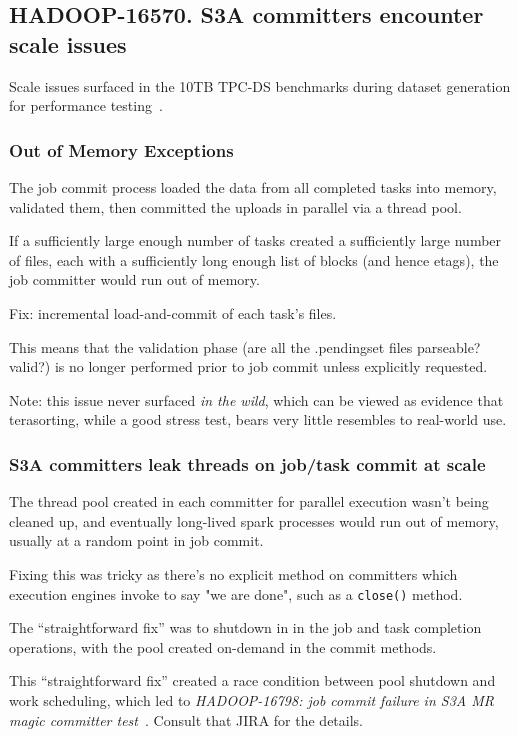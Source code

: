 \documentclass[conference]{IEEEtran}
\begin{document}
\subsection{HADOOP-16570. S3A committers encounter scale issues}
\label{subsec:scale}


Scale issues surfaced in the 10TB TPC-DS benchmarks during dataset generation
for performance testing\ \cite{HADOOP-16570}.

\subsubsection{Out of Memory Exceptions}

The job commit process loaded the data from all completed tasks into memory,
validated them, then committed the uploads in parallel via a thread pool.

If a sufficiently large enough number of tasks created a sufficiently large
number of files, each with a sufficiently long enough list of blocks
(and hence etags), the job committer would run out of memory.

Fix: incremental load-and-commit of each task's files.

This means that the validation phase
(are all the .pendingset files parseable? valid?) is no longer performed
prior to job commit unless explicitly requested.

Note: this issue never surfaced \emph{in the wild}, which can be
viewed as evidence that terasorting, while a good stress test,
bears very little resembles to real-world use.

\subsubsection{S3A committers leak threads on job/task commit at scale}

The thread pool created in each committer for parallel execution wasn't being
cleaned up, and eventually long-lived spark processes would run out of memory,
usually at a random point in job commit.

Fixing this was tricky as there's no explicit method on committers which
execution engines invoke to say "we are done", such as a \texttt{close()} method.

The ``straightforward fix'' was to shutdown in in the job and task completion
operations, with the pool created on-demand in the commit methods.

This ``straightforward fix'' created a race condition between pool shutdown
and work scheduling, which led to \emph{HADOOP-16798: job commit failure in S3A
MR magic committer test}\ \cite{HADOOP-16798}.
Consult that JIRA for the details.
\end{document}
